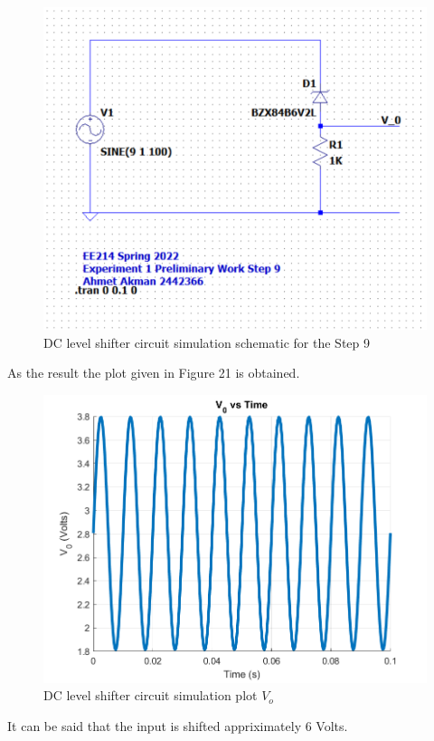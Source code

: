 \documentclass[letterpaper,12pt]{article}
\begin{document}
\begin{figure}[H]
    \centering
   \includegraphics[width=1\textwidth]{9SCH.png}
   \caption{DC level shifter circuit simulation schematic for the Step 9}
\end{figure} 
As the result the plot given in Figure 21 is obtained.

\begin{figure}[H]
    \centering
   \includegraphics[width=1\textwidth]{9.png}
   \caption{DC level shifter circuit simulation  plot \(V_o\)}
\end{figure} 
It can be said that the input is shifted appriximately 6 Volts.
\end{document}
